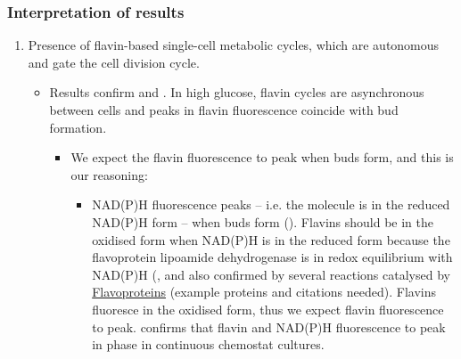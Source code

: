 \subsubsection{Interpretation of results}
\label{sec:org8e6afd2}
\begin{enumerate}
\item Presence of flavin-based single-cell metabolic cycles, which are autonomous and gate the cell division cycle.
\begin{itemize}
\item Results confirm \cite{papagiannakisAutonomousMetabolicOscillations2017} and \cite{baumgartnerFlavinbasedMetabolicCycles2018}.  In high glucose, flavin cycles are asynchronous between cells and peaks in flavin fluorescence coincide with bud formation.
\begin{itemize}
\item We expect the flavin fluorescence to peak when buds form, and this is our reasoning:
\begin{itemize}
\item NAD(P)H fluorescence peaks -- i.e. the molecule is in the reduced NAD(P)H form -- when buds form (\cite{papagiannakisAutonomousMetabolicOscillations2017}).  Flavins should be in the oxidised form when NAD(P)H is in the reduced form because the flavoprotein lipoamide dehydrogenase is in redox equilibrium with NAD(P)H (\cite{sianoNADHFlavinFluorescence1989}, and also confirmed by several reactions catalysed by \href{Flavoproteins.org}{Flavoproteins} (example proteins and citations needed).  Flavins fluoresce in the oxidised form, thus we expect flavin fluorescence to peak. \cite{murrayRedoxRegulationRespiring2011} confirms that flavin and NAD(P)H fluorescence to peak in phase in continuous chemostat cultures.
\end{itemize}


\end{itemize}
\end{itemize}
\end{enumerate}
